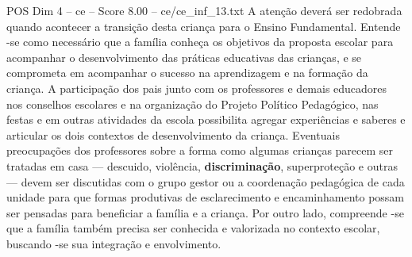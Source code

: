 \begin{textsample}{POS Dim 4 – ce – Score 8.00 – ce/ce\_inf\_13.txt}
A atenção deverá ser redobrada quando acontecer a transição desta criança para o Ensino Fundamental.
Entende -se como necessário que a família conheça os objetivos da proposta escolar para acompanhar o desenvolvimento das práticas educativas das crianças, e se comprometa em acompanhar o sucesso na aprendizagem e na formação da criança.
A participação dos pais junto com os professores e demais educadores nos conselhos escolares e na organização do Projeto Político Pedagógico, nas festas e em outras atividades da escola possibilita agregar experiências e saberes e articular os dois contextos de desenvolvimento da criança.
Eventuais preocupações dos professores sobre a forma como algumas crianças parecem ser tratadas em casa — descuido, violência, \textbf{discriminação}, superproteção e outras — devem ser discutidas com o grupo gestor ou a coordenação pedagógica de cada unidade para que formas produtivas de esclarecimento e encaminhamento possam ser pensadas para beneficiar a família e a criança.
Por outro lado, compreende -se que a família também precisa ser conhecida e valorizada no contexto escolar, buscando -se sua integração e envolvimento.

\end{textsample}
